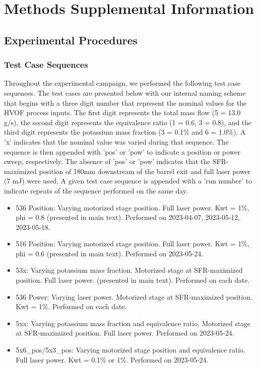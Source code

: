 
\section{Methods Supplemental Information}


\subsection{Experimental Procedures}

\subsubsection{Test Case Sequences}


Throughout the experimental campaign, we performed the following test case sequences. The test cases are presented below with our internal naming scheme that begins with a three digit number that represent the nominal values for the HVOF process inputs. The first digit represents the total mass flow (5 = 13.0 g/s), the second digit represents the equivalence ratio (1 = 0.6, 3 = 0.8), and the third digit represents the potassium mass fraction (3 = 0.1\% and 6 = 1.0\%). A 'x' indicates that the nominal value was varied during that sequence. The sequence is then appended with 'pos' or 'pow' to indicate a position or power sweep, respectively. The absence of 'pos' or 'pow' indicates that the SFR-maximized position of 180mm downstream of the barrel exit and full laser power (7 mJ) were used. A given test case sequence is appended with a 'run number' to indicate repeats of the sequence performed on the same day. 

\begin{itemize}
    \item 536 Position: Varying motorized stage position. Full laser power. Kwt = 1\%, phi = 0.8 (presented in main text). Performed on 2023-04-07, 2023-05-12, 2023-05-18.
    \item 516 Position: Varying motorized stage position. Full laser power. Kwt = 1\%, phi = 0.6 (presented in main text). Performed on 2023-05-24.
    \item 53x: Varying potassium mass fraction. Motorized stage at SFR-maximized position. Full laser power. (presented in main text). Performed on each date. 
    \item 536 Power: Varying laser power. Motorized stage at SFR-maximized position. Kwt = 1\%. Performed on each date. 
    \item 5xx: Varying potassium mass fraction and equivalence ratio. Motorized stage at SFR-maximized position. Full laser power. Performed on 2023-05-24.
    \item 5x6\_pos/5x3\_pos: Varying motorized stage position and equivalence ratio. Full laser power. Kwt = 0.1\% or 1\%. Performed on 2023-05-24.
\end{itemize}

